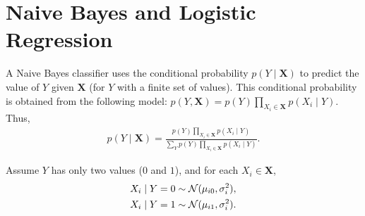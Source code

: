 \documentclass[11pt]{article}
\renewcommand{\vec}[1]{\mathbf{#1}}
\begin{document}
\pagebreak
\section{Naive Bayes and Logistic Regression}

A Naive Bayes classifier uses the conditional probability $p(Y \mid \vec{X})$ to predict the value of $Y$ given $\vec{X}$ (for $Y$ with a finite set of values).
This conditional probability is obtained from the following model: $p(Y, \vec{X}) = p(Y) \prod_{X_i \in \vec{X}} p(X_i \mid Y)$.
Thus,
\begin{align*}
p(Y \mid \vec{X}) =
\frac{
p(Y) \prod_{X_i \in \vec{X}} p(X_i \mid Y)
}{
\sum_Y p(Y) \prod_{X_i \in \vec{X}} p(X_i \mid Y)
}.
\end{align*}

Assume $Y$ has only two values ($0$ and $1$), and for each $X_i \in \vec{X}$,
\begin{align*}
X_i \mid Y=0 &\sim {\cal N}(\mu_{i0}, \sigma_i^2),\\
X_i \mid Y=1 &\sim {\cal N}(\mu_{i1}, \sigma_i^2).
\end{align*}
\end{document}
